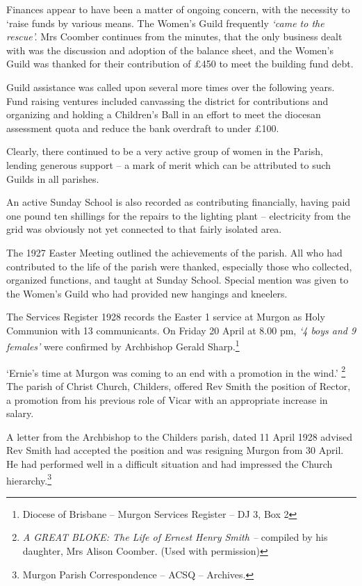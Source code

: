 Finances appear to have been a matter of ongoing concern, with the necessity to `raise funds by various means. The Women's Guild frequently \emph{`came to the rescue'.} Mrs Coomber continues from the minutes, that the only business dealt with was the discussion and adoption of the balance sheet, and the Women's Guild was thanked for their contribution of £450 to meet the building fund debt.

Guild assistance was called upon several more times over the following years. Fund raising ventures included canvassing the district for contributions and organizing and holding a Children's Ball in an effort to meet the diocesan assessment quota and reduce the bank overdraft to under £100.

Clearly, there continued to be a very active group of women in the Parish, lending generous support -- a mark of merit which can be attributed to such Guilds in all parishes.

An active Sunday School is also recorded as contributing financially, having paid one pound ten shillings for the repairs to the lighting plant -- electricity from the grid was obviously not yet connected to that fairly isolated area.

The 1927 Easter Meeting outlined the achievements of the parish. All who had contributed to the life of the parish were thanked, especially those who collected, organized functions, and taught at Sunday School. Special mention was given to the Women's Guild who had provided new hangings and kneelers.

The Services Register 1928 records the Easter 1 service at Murgon as Holy Communion with 13 communicants. On Friday 20 April at 8.00 pm, \emph{`4 boys and 9 females'} were confirmed by Archbishop Gerald Sharp.\footnote{Diocese of Brisbane -- Murgon Services Register -- DJ 3, Box 2}

`Ernie's time at Murgon was coming to an end with a promotion in the wind.' \footnote{\emph{A GREAT BLOKE: The Life of Ernest Henry Smith --} compiled by his daughter, Mrs Alison Coomber. (Used with permission)} The parish of Christ Church, Childers, offered Rev Smith the position of Rector, a promotion from his previous role of Vicar with an appropriate increase in salary.

A letter from the Archbishop to the Childers parish, dated 11 April 1928 advised Rev Smith had accepted the position and was resigning Murgon from 30 April. He had performed well in a difficult situation and had impressed the Church hierarchy.\footnote{Murgon Parish Correspondence -- ACSQ -- Archives.}


